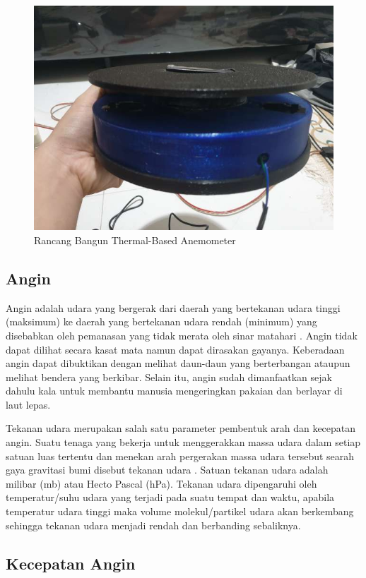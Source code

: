\begin{figure}[h!]
	\centering
	\includegraphics[width=0.7\linewidth]{gambar/fig_alat_cahyolaksono}
	\caption{Rancang Bangun Thermal-Based Anemometer \parencite{Cahyolaksono2022}}
	\label{fig:figalatcahyolaksono}
\end{figure}

\subsection{Angin}

Angin adalah udara yang bergerak dari daerah yang bertekanan udara tinggi (maksimum) ke daerah yang bertekanan udara rendah (minimum) yang disebabkan oleh
pemanasan yang tidak merata oleh sinar matahari \parencites{turgeon2022wind}. Angin tidak 
dapat dilihat secara kasat mata namun dapat dirasakan gayanya. Keberadaan angin dapat dibuktikan dengan melihat daun-daun yang berterbangan ataupun melihat bendera yang berkibar. Selain 
itu, angin sudah dimanfaatkan sejak dahulu kala untuk membantu manusia mengeringkan pakaian dan 
berlayar di laut lepas.

Tekanan udara merupakan salah satu parameter pembentuk arah dan kecepatan angin.
Suatu tenaga yang bekerja untuk menggerakkan massa udara dalam 
setiap satuan luas tertentu dan menekan arah pergerakan massa udara tersebut searah 
gaya gravitasi bumi disebut tekanan udara \parencites{yulkifli2016pengukuran}. Satuan tekanan udara adalah milibar (mb) atau Hecto Pascal (hPa). 
Tekanan udara dipengaruhi oleh temperatur/suhu udara yang terjadi pada suatu tempat dan 
waktu, apabila temperatur udara tinggi maka volume molekul/partikel udara akan berkembang 
sehingga tekanan udara menjadi rendah dan berbanding sebaliknya. 

\subsection{Kecepatan Angin}



